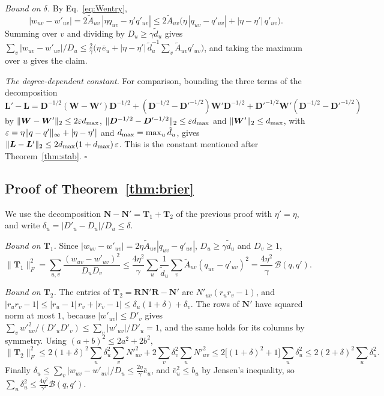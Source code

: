 \emph{Bound on $\delta$.}
By Eq.~\eqref{eq:Wentry},
\[
|w_{uv}-w'_{uv}|=2\tilde A_{uv}\,|\eta q_{uv}-\eta'q'_{uv}|
\le2\tilde A_{uv}\bigl(\eta\,|q_{uv}-q'_{uv}|+|\eta-\eta'|\,q'_{uv}\bigr).
\]
Summing over $v$ and dividing by $D_u\ge\gamma\tilde d_u$ gives $\sum_v|w_{uv}-w'_{uv}|/D_u\le\tfrac2\gamma\bigl(\eta\,\bar e_u+|\eta-\eta'|\,\tilde d_u^{-1}\sum_v\tilde A_{uv}q'_{uv}\bigr)$, and taking the maximum over $u$ gives the claim.

\emph{The degree-dependent constant.}
For comparison, bounding the three terms of the decomposition $\bm L'-\bm L=\bm D^{-1/2}(\bm W-\bm W')\bm D^{-1/2}+(\bm D^{-1/2}-\bm D'^{-1/2})\bm W'\bm D^{-1/2}+\bm D'^{-1/2}\bm W'(\bm D^{-1/2}-\bm D'^{-1/2})$ by $\|\bm W-\bm W'\|_2\le2\varepsilon d_{\max}$, $\|\bm D^{-1/2}-\bm D'^{-1/2}\|_2\le\varepsilon d_{\max}$ and $\|\bm W'\|_2\le d_{\max}$, with $\varepsilon=\eta\|q-q'\|_\infty+|\eta-\eta'|$ and $d_{\max}=\max_u\tilde d_u$, gives $\|\bm L-\bm L'\|_2\le2d_{\max}(1+d_{\max})\,\varepsilon$.
This is the constant mentioned after Theorem~\ref{thm:stab}.
\hfill$\square$

\subsection{Proof of Theorem~\ref{thm:brier}}
We use the decomposition $\bm N-\bm N'=\bm T_1+\bm T_2$ of the previous proof with $\eta'=\eta$, and write $\delta_u=|D'_u-D_u|/D_u\le\delta$.

\emph{Bound on $\bm T_1$.}
Since $|w_{uv}-w'_{uv}|=2\eta\tilde A_{uv}|q_{uv}-q'_{uv}|$, $D_u\ge\gamma\tilde d_u$ and $D_v\ge1$,
\[
\|\bm T_1\|_F^2=\sum_{u,v}\frac{(w_{uv}-w'_{uv})^2}{D_uD_v}
\le\frac{4\eta^2}{\gamma}\sum_u\frac{1}{\tilde d_u}\sum_v\tilde A_{uv}(q_{uv}-q'_{uv})^2=\frac{4\eta^2}{\gamma}\,\mathcal B(q,q').
\]

\emph{Bound on $\bm T_2$.}
The entries of $\bm T_2=\bm R\bm N'\bm R-\bm N'$ are $N'_{uv}(r_ur_v-1)$, and
$|r_ur_v-1|\le|r_u-1|\,r_v+|r_v-1|\le\delta_u(1+\delta)+\delta_v$.
The rows of $\bm N'$ have squared norm at most $1$, because $|w'_{uv}|\le D'_v$ gives
$\sum_vw'^2_{uv}/(D'_uD'_v)\le\sum_v|w'_{uv}|/D'_u=1$, and the same holds for its columns by symmetry.
Using $(a+b)^2\le2a^2+2b^2$,
\[
\|\bm T_2\|_F^2\le2(1+\delta)^2\sum_u\delta_u^2\sum_vN'^2_{uv}+2\sum_v\delta_v^2\sum_uN'^2_{uv}
\le2\bigl[(1+\delta)^2+1\bigr]\sum_u\delta_u^2\le2(2+\delta)^2\sum_u\delta_u^2.
\]
Finally $\delta_u\le\sum_v|w_{uv}-w'_{uv}|/D_u\le\tfrac{2\eta}{\gamma}\bar e_u$, and $\bar e_u^2\le b_u$ by Jensen's inequality, so $\sum_u\delta_u^2\le\tfrac{4\eta^2}{\gamma^2}\mathcal B(q,q')$.

